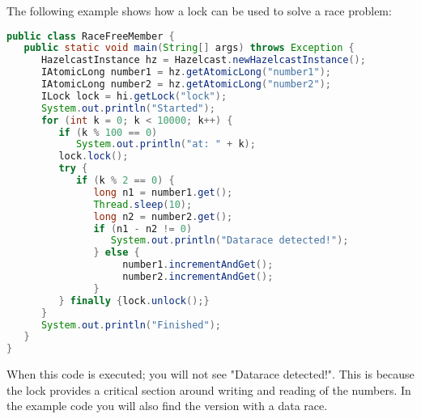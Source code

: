 The following example shows how a lock can be used to solve a race problem:
\begin{lstlisting}[language=java]
public class RaceFreeMember {
   public static void main(String[] args) throws Exception {
      HazelcastInstance hz = Hazelcast.newHazelcastInstance();
      IAtomicLong number1 = hz.getAtomicLong("number1");
      IAtomicLong number2 = hz.getAtomicLong("number2");
      ILock lock = hi.getLock("lock");
      System.out.println("Started");
      for (int k = 0; k < 10000; k++) {
         if (k % 100 == 0) 
            System.out.println("at: " + k);
         lock.lock();
         try {
            if (k % 2 == 0) {
               long n1 = number1.get();
               Thread.sleep(10);
               long n2 = number2.get();
               if (n1 - n2 != 0) 
                  System.out.println("Datarace detected!");
               } else {
                    number1.incrementAndGet();
                    number2.incrementAndGet();
               }
         } finally {lock.unlock();}
      }
      System.out.println("Finished");
   }
}
\end{lstlisting}
When this code is executed; you will not see "Datarace detected!". This is because the lock provides a critical section around writing and reading of the numbers. In the example code you will also find the version with a data race.

